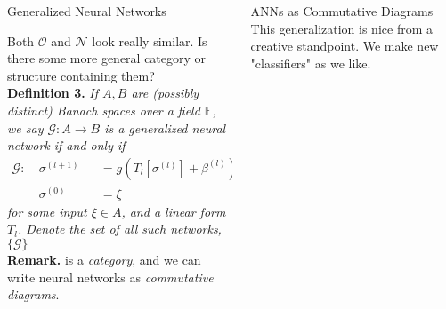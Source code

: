 \begin{columns}[t,totalwidth=\twocolwid] %

\begin{column}{\onecolwid}\vspace{-.6in} %

	\begin{block}{Generalized Neural Networks}

	{Both $\mathcal{O}$ and $\mathcal{N}$ look really similar. Is there some more general category or structure containing them?} \\[0.7cm]

	\textbf{Definition 3.} \emph{If $A,B$ are (possibly distinct) Banach spaces over a field $\mathbb{F}$,
		we say $\mathcal{G}: A \to B$ is a generalized neural network if and only if }
	\begin{equation} \label{eq:gann}
	          \begin{alignedat}{2}
	        \mathcal{G}:\ &\sigma^{(l+1)} & &=  g\left(T_l\left[\sigma^{(l)}\right] + \beta^{(l)}\right)  \\
	        &\sigma^{(0)} & &= \xi 
	        \end{alignedat}
	\end{equation}
	\emph{for some input $\xi \in A$, and a linear form $T_l$. Denote the set of all such networks, $\{\mathcal{G}\}$} \\[0.7cm]
	\textbf{Remark.}  is a \emph{category}, and we can write neural networks as \emph{commutative diagrams}.
	\end{block}
\end{column}


\begin{column}{\onecolwid}\vspace{-.6in} %

\begin{block}{ANNs as Commutative Diagrams}
This generalization is nice from a creative standpoint. We make new "classifiers" as we like. \\


\end{block}
\end{column}
\end{columns}
